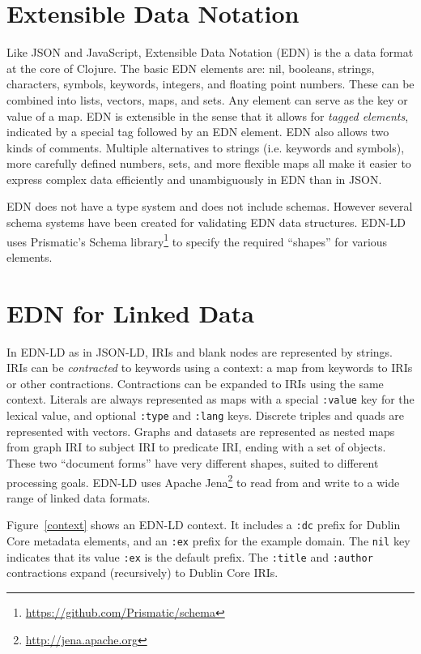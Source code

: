 \documentclass{icbo}
\begin{document}
\section{Extensible Data Notation}

Like JSON and JavaScript, Extensible Data Notation (EDN) is the a data format at the core of Clojure. The basic EDN elements are: nil, booleans, strings, characters, symbols, keywords, integers, and floating point numbers. These can be combined into lists, vectors, maps, and sets. Any element can serve as the key or value of a map. EDN is extensible in the sense that it allows for {\it tagged elements}, indicated by a special tag followed by an EDN element. EDN also allows two kinds of comments. Multiple alternatives to strings (i.e. keywords and symbols), more carefully defined numbers, sets, and more flexible maps all make it easier to express complex data efficiently and unambiguously in EDN than in JSON.

EDN does not have a type system and does not include schemas. However several schema systems have been created for validating EDN data structures. EDN-LD uses Prismatic's Schema library\footnote{\url{https://github.com/Prismatic/schema}} to specify the required ``shapes'' for various elements.


\section{EDN for Linked Data}

In EDN-LD as in JSON-LD, IRIs and blank nodes are represented by strings. IRIs can be {\it contracted} to keywords using a context: a map from keywords to IRIs or other contractions. Contractions can be expanded to IRIs using the same context. Literals are always represented as maps with a special {\tt :value} key for the lexical value, and optional {\tt :type} and {\tt :lang} keys. Discrete triples and quads are represented with vectors. Graphs and datasets are represented as nested maps from graph IRI to subject IRI to predicate IRI, ending with a set of objects. These two ``document forms'' have very different shapes, suited to different processing goals. EDN-LD uses Apache Jena\footnote{\url{http://jena.apache.org}} to read from and write to a wide range of linked data formats.

Figure~\ref{context} shows an EDN-LD context. It includes a {\tt :dc} prefix for Dublin Core metadata elements, and an {\tt :ex} prefix for the example domain. The {\tt nil} key indicates that its value {\tt :ex} is the default prefix. The {\tt :title} and {\tt :author} contractions expand (recursively) to Dublin Core IRIs.
\end{document}
